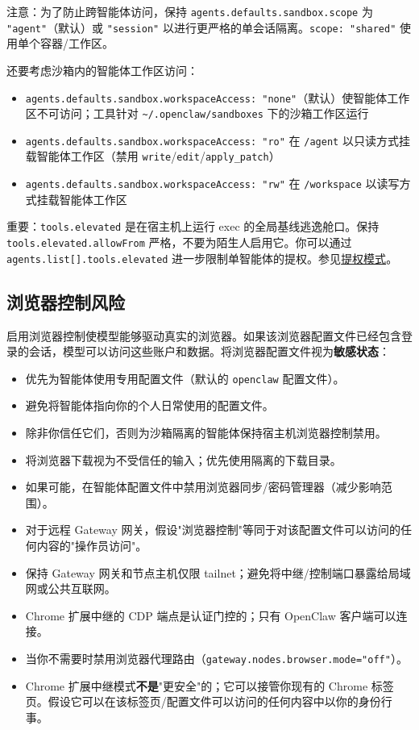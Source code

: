 注意：为了防止跨智能体访问，保持 \texttt{agents.defaults.sandbox.scope} 为 \texttt{"agent"}（默认）或 \texttt{"session"} 以进行更严格的单会话隔离。\texttt{scope: "shared"} 使用单个容器/工作区。

还要考虑沙箱内的智能体工作区访问：

\begin{itemize}
  \item \texttt{agents.defaults.sandbox.workspaceAccess: "none"}（默认）使智能体工作区不可访问；工具针对 \texttt{\textasciitilde{}/.openclaw/sandboxes} 下的沙箱工作区运行
  \item \texttt{agents.defaults.sandbox.workspaceAccess: "ro"} 在 \texttt{/agent} 以只读方式挂载智能体工作区（禁用 \texttt{write}/\texttt{edit}/\texttt{apply\_patch}）
  \item \texttt{agents.defaults.sandbox.workspaceAccess: "rw"} 在 \texttt{/workspace} 以读写方式挂载智能体工作区
\end{itemize}


重要：\texttt{tools.elevated} 是在宿主机上运行 exec 的全局基线逃逸舱口。保持 \texttt{tools.elevated.allowFrom} 严格，不要为陌生人启用它。你可以通过 \texttt{agents.list[].tools.elevated} 进一步限制单智能体的提权。参见\href{/tools/elevated}{提权模式}。

\subsection{浏览器控制风险}


启用浏览器控制使模型能够驱动真实的浏览器。如果该浏览器配置文件已经包含登录的会话，模型可以访问这些账户和数据。将浏览器配置文件视为\textbf{敏感状态}：

\begin{itemize}
  \item 优先为智能体使用专用配置文件（默认的 \texttt{openclaw} 配置文件）。
  \item 避免将智能体指向你的个人日常使用的配置文件。
  \item 除非你信任它们，否则为沙箱隔离的智能体保持宿主机浏览器控制禁用。
  \item 将浏览器下载视为不受信任的输入；优先使用隔离的下载目录。
  \item 如果可能，在智能体配置文件中禁用浏览器同步/密码管理器（减少影响范围）。
  \item 对于远程 Gateway 网关，假设"浏览器控制"等同于对该配置文件可以访问的任何内容的"操作员访问"。
  \item 保持 Gateway 网关和节点主机仅限 tailnet；避免将中继/控制端口暴露给局域网或公共互联网。
  \item Chrome 扩展中继的 CDP 端点是认证门控的；只有 OpenClaw 客户端可以连接。
  \item 当你不需要时禁用浏览器代理路由（\texttt{gateway.nodes.browser.mode="off"}）。
  \item Chrome 扩展中继模式\textbf{不是}"更安全"的；它可以接管你现有的 Chrome 标签页。假设它可以在该标签页/配置文件可以访问的任何内容中以你的身份行事。
\end{itemize}


